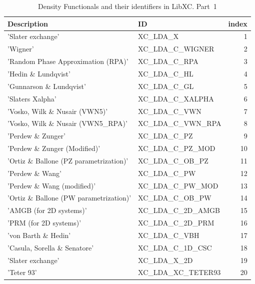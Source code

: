 \documentclass[final,12pt,makeidx,DIV=calc]{article}
\begin{document}
{{{\begin{table}[hbt]
\caption{\label{tab:libxc1}Density Functionals and their identifiers
  in LibXC. Part~1}
\begin{center}
\begin{tabular}{llr}
\hline
\hline
Description & ID & index\\
\hline
  'Slater exchange' & XC\_LDA\_X  &  1\\
  'Wigner' & XC\_LDA\_C\_WIGNER  &  2\\
  'Random Phase Approximation (RPA)' & XC\_LDA\_C\_RPA  &  3\\
  'Hedin \& Lundqvist' & XC\_LDA\_C\_HL  &  4\\
  'Gunnarson \& Lundqvist' & XC\_LDA\_C\_GL  &  5\\
  'Slaters Xalpha' & XC\_LDA\_C\_XALPHA  &  6\\
  'Vosko, Wilk \& Nusair (VWN5)' & XC\_LDA\_C\_VWN  &  7\\
  'Vosko, Wilk \& Nusair (VWN5\_RPA)' & XC\_LDA\_C\_VWN\_RPA  &  8\\
  'Perdew \& Zunger' & XC\_LDA\_C\_PZ  &  9\\
  'Perdew \& Zunger (Modified)' & XC\_LDA\_C\_PZ\_MOD  & 10\\
  'Ortiz \& Ballone (PZ parametrization)' & XC\_LDA\_C\_OB\_PZ  & 11\\
  'Perdew \& Wang' & XC\_LDA\_C\_PW  & 12\\
  'Perdew \& Wang (modified)' & XC\_LDA\_C\_PW\_MOD  & 13\\
  'Ortiz \& Ballone (PW parametrization)' & XC\_LDA\_C\_OB\_PW  & 14\\
  'AMGB (for 2D systems)' & XC\_LDA\_C\_2D\_AMGB  & 15\\
  'PRM (for 2D systems)' & XC\_LDA\_C\_2D\_PRM  & 16\\
  'von Barth \& Hedin' & XC\_LDA\_C\_VBH  & 17\\
  'Casula, Sorella \& Senatore' & XC\_LDA\_C\_1D\_CSC  & 18\\
  'Slater exchange' & XC\_LDA\_X\_2D  & 19\\
  'Teter 93' & XC\_LDA\_XC\_TETER93  & 20\\
\hline
\hline
\end{tabular}
\end{center}
\end{table}


}}}
\end{document}
